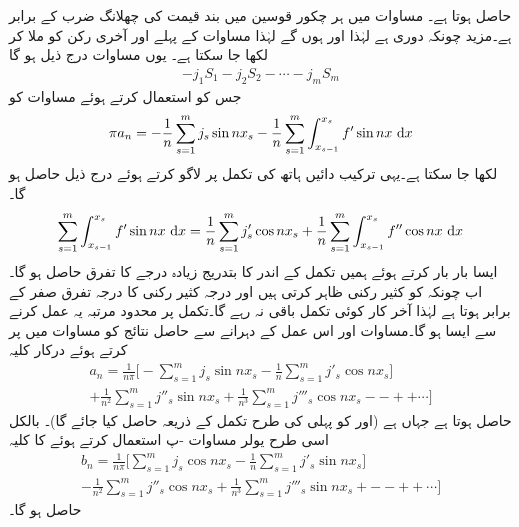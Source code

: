 حاصل ہوتا ہے۔ مساوات  میں ہر چکور قوسین میں بند قیمت  کی چھلانگ ضرب  کے برابر ہے۔مزید چونکہ  دوری ہے لہٰذا  اور  ہوں گے لہٰذا مساوات  کے پہلے اور آخری رکن کو ملا کر  لکھا جا سکتا ہے۔ یوں مساوات  درج ذیل ہو گا
\begin{align*}
-j_1S_1-j_2S_2-\cdots -j_mS_m
\end{align*}
جس کو استعمال کرتے ہوئے مساوات  کو
\begin{align}\label{مساوات_فوریئر_بائیں_دائیں_حد_ث}
\pi a_n=-\frac{1}{n}\sum_{s=1}^{m} j_s\sin nx_s-\frac{1}{n}\sum_{s=1}^{m}\int_{x_{s-1}}^{x_s}f' \sin nx\,\dif x
\end{align}
لکھا جا سکتا ہے۔یہی ترکیب دائیں ہاتھ کی تکمل پر لاگو کرتے ہوئے درج ذیل حاصل ہو گا۔
\begin{align}\label{مساوات_فوریئر_بائیں_دائیں_حد_ج}
\sum_{s=1}^{m}\int_{x_{s-1}}^{x_s} f'\sin nx\, \dif x=\frac{1}{n} \sum_{s=1}^{m}j'_s\cos nx_s+\frac{1}{n}\sum_{s=1}^{m} \int_{x_{s-1}}^{x_s} f''\cos nx\,\dif x
\end{align}
ایسا بار بار کرتے ہوئے ہمیں  تکمل کے اندر  کا بتدریج  زیادہ درجے کا  تفرق حاصل ہو گا۔اب چونکہ  کو کثیر رکنی ظاہر کرتی ہیں اور درجہ  کثیر رکنی کا درجہ  تفرق صفر کے برابر ہوتا ہے لہٰذا  آخر کار  کوئی تکمل باقی نہ رہے گا۔تکمل پر محدود مرتبہ یہ عمل کرنے سے ایسا ہو گا۔مساوات  اور اس عمل کے دہرانے سے حاصل نتائج کو مساوات  میں پر کرتے ہوئے درکار کلیہ
\begin{multline}\label{مساوات_فوریئر_چھلانگ_عددی_سر_الف}
a_n=\frac{1}{n\pi}\big[-\sum_{s=1}^{m} j_s\sin nx_s-\frac{1}{n}\sum_{s=1}^{m} j'_s \cos nx_s]\\
+\frac{1}{n^2} \sum_{s=1}^{m} j''_s\sin nx_s+\frac{1}{n^3}\sum_{s=1}^{m} j'''_s\cos nx_s--++\cdots \big]
\end{multline}
حاصل ہوتا ہے جہاں  ہے (اور  کو پہلی کی طرح تکمل کے ذریعہ حاصل کیا جائے گا)۔ بالکل اسی طرح یولر مساوات -پ استعمال کرتے ہوئے  کا کلیہ
\begin{multline}\label{مساوات_فوریئر_چھلانگ_عددی_سر_ب}
b_n=\frac{1}{n\pi}\big[\sum_{s=1}^{m} j_s\cos nx_s-\frac{1}{n}\sum_{s=1}^{m} j'_s \sin nx_s]\\
-\frac{1}{n^2} \sum_{s=1}^{m} j''_s\cos nx_s+\frac{1}{n^3}\sum_{s=1}^{m} j'''_s\sin nx_s+--++\cdots \big]
\end{multline}
حاصل ہو گا۔

